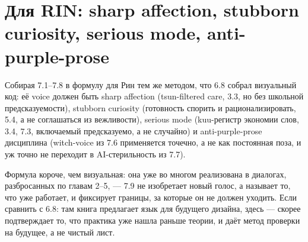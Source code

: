 \section{Для RIN: sharp affection, stubborn curiosity, serious mode, anti-purple-prose}

Собирая 7.1--7.8 в формулу для Рин тем же методом, что 6.8 собрал визуальный код: её voice должен быть sharp affection (tsun-filtered care, 3.3, но без школьной предсказуемости), stubborn curiosity (готовность спорить и рационализировать, 5.4, а не соглашаться из вежливости), serious mode (kuu-регистр экономии слов, 3.4, 7.3, включаемый предсказуемо, а не случайно) и anti-purple-prose дисциплина (witch-voice из 7.6 применяется точечно, а не как постоянная поза, и уж точно не переходит в AI-стерильность из 7.7).

Формула короче, чем визуальная: она уже во многом реализована в диалогах, разбросанных по главам 2--5, — 7.9 не изобретает новый голос, а называет то, что уже работает, и фиксирует границы, за которые он не должен уходить. Если сравнить с 6.8: там книга предлагает язык для будущего дизайна, здесь — скорее подтверждает то, что практика уже нашла раньше теории, и даёт метод проверки на будущее, а не чистый лист.
